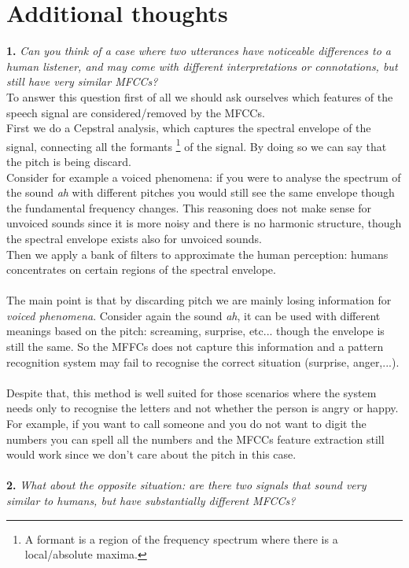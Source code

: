 \section{Additional thoughts}
\textbf{1. }\textit{Can you think of a case where two
utterances have noticeable differences to a human listener, and may
come with different interpretations or connotations, but still have very
similar MFCCs?}\\

To answer this question first of all we should ask ourselves which features of the speech signal are considered/removed by the MFCCs.\\
First we do a Cepstral analysis, which captures the spectral envelope of the signal, connecting all the formants \footnote{A formant is a region of the frequency spectrum where there is a local/absolute maxima.} of the signal. By doing so we can say that the pitch is being discard. \\Consider for example a voiced phenomena: if you were to analyse the spectrum of the sound \textit{ah} with different pitches you would still see the same envelope though the fundamental frequency changes. This reasoning does not make sense for unvoiced sounds since it is more noisy and there is no harmonic structure, though the spectral envelope exists also for unvoiced sounds. \\ Then we apply a bank of filters to approximate the human perception: humans concentrates on certain regions of the spectral envelope.\\ \\
The main point is that by discarding pitch we are mainly losing information for \textit{voiced phenomena}. Consider again the sound \textit{ah}, it can be used with different meanings based on the pitch: screaming, surprise, etc... though the envelope is still the same. So the MFFCs does not capture this information and a pattern recognition system may fail to recognise the correct situation (surprise, anger,...). \\ \\
Despite that, this method is well suited for those scenarios where the system needs only to recognise the letters and not whether the person is angry or happy. For example, if you want to call someone and you do not want to digit the numbers you can spell all the numbers and the MFCCs feature extraction still would work since we don't care about the pitch in this case.
\\ \\
\textbf{2. }\textit{What about the opposite situation: are there two signals
that sound very similar to humans, but have substantially different
MFCCs?}\\

